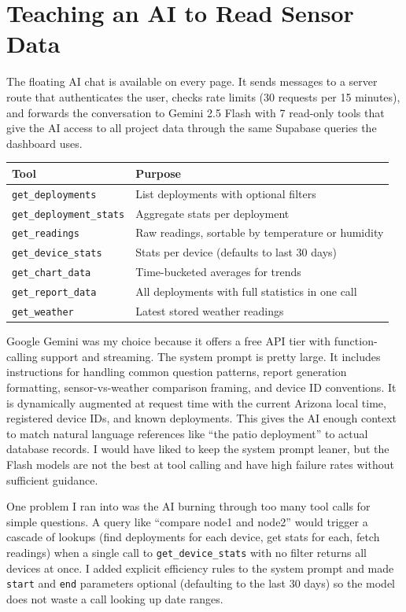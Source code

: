 \documentclass[11pt, letterpaper]{article}
\begin{document}
\section{Teaching an AI to Read Sensor Data}

The floating AI chat is available on every page. It sends messages to a server route that authenticates the user, checks rate limits (30 requests per 15 minutes), and forwards the conversation to Gemini 2.5 Flash with 7 read-only tools that give the AI access to all project data through the same Supabase queries the dashboard uses.

\begin{table}[H]
\centering\sffamily\small
\begin{tabularx}{\textwidth}{@{}lX@{}}
\toprule
\textbf{Tool} & \textbf{Purpose} \\
\midrule
\texttt{get\_deployments} & List deployments with optional filters \\
\texttt{get\_deployment\_stats} & Aggregate stats per deployment \\
\texttt{get\_readings} & Raw readings, sortable by temperature or humidity \\
\texttt{get\_device\_stats} & Stats per device (defaults to last 30 days) \\
\texttt{get\_chart\_data} & Time-bucketed averages for trends \\
\texttt{get\_report\_data} & All deployments with full statistics in one call \\
\texttt{get\_weather} & Latest stored weather readings \\
\bottomrule
\end{tabularx}
\end{table}

Google Gemini was my choice because it offers a free API tier with function-calling support and streaming. The system prompt is pretty large. It includes instructions for handling common question patterns, report generation formatting, sensor-vs-weather comparison framing, and device ID conventions. It is dynamically augmented at request time with the current Arizona local time, registered device IDs, and known deployments. This gives the AI enough context to match natural language references like ``the patio deployment'' to actual database records. I would have liked to keep the system prompt leaner, but the Flash models are not the best at tool calling and have high failure rates without sufficient guidance.

One problem I ran into was the AI burning through too many tool calls for simple questions. A query like ``compare node1 and node2'' would trigger a cascade of lookups (find deployments for each device, get stats for each, fetch readings) when a single call to \texttt{get\_device\_stats} with no filter returns all devices at once. I added explicit efficiency rules to the system prompt and made \texttt{start} and \texttt{end} parameters optional (defaulting to the last 30 days) so the model does not waste a call looking up date ranges.
\end{document}
